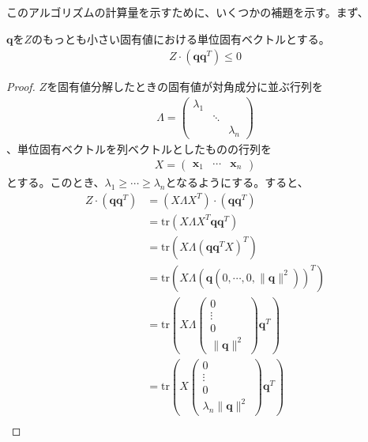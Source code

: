 このアルゴリズムの計算量を示すために、いくつかの補題を示す。まず、
\begin{lemma*}
  $\mathbf{q}$を$Z$のもっとも小さい固有値における単位固有ベクトルとする。
  \begin{align*}
    Z \cdot (\mathbf{q} \mathbf{q}^T) \leq 0
  \end{align*}
\end{lemma*}
\begin{proof}
  $Z$を固有値分解したときの固有値が対角成分に並ぶ行列を
  \begin{align*}
    \Lambda = \left(
                \begin{array}{ccc}
                  \lambda_1 &        & \\
                            & \ddots & \\
                            &        & \lambda_n
                \end{array}
              \right)
  \end{align*}
  、単位固有ベクトルを列ベクトルとしたものの行列を
  \begin{align*}
    X = \left(
          \begin{array}{ccc}
            \mathbf{x}_1 & \cdots & \mathbf{x}_n
          \end{array}
        \right)
  \end{align*}
  とする。このとき、$\lambda_1 \geq \cdots \geq \lambda_n$となるようにする。すると、
  \begin{align*}
    Z \cdot (\mathbf{q} \mathbf{q}^T) & = (X \Lambda X^T) \cdot (\mathbf{q} \mathbf{q}^T) \\
                                      & = \mathrm{tr}(X \Lambda X^T \mathbf{q} \mathbf{q}^T) \\
                                      & = \mathrm{tr}(X \Lambda (\mathbf{q} \mathbf{q}^T X)^T) \\
                                      & = \mathrm{tr}(X \Lambda (\mathbf{q} \left(0, \cdots, 0, \|\mathbf{q}\|^2\right))^T) \\
                                      & = \mathrm{tr}(X \Lambda \left(\begin{array}{c} 0 \\ \vdots \\ 0 \\ \|\mathbf{q}\|^2 \end{array}\right) \mathbf{q}^T) \\
                                      & = \mathrm{tr}(X \left(\begin{array}{c} 0 \\ \vdots \\ 0 \\ \lambda_n \|\mathbf{q}\|^2 \end{array}\right) \mathbf{q}^T) \\

\end{align*}
\end{proof}
